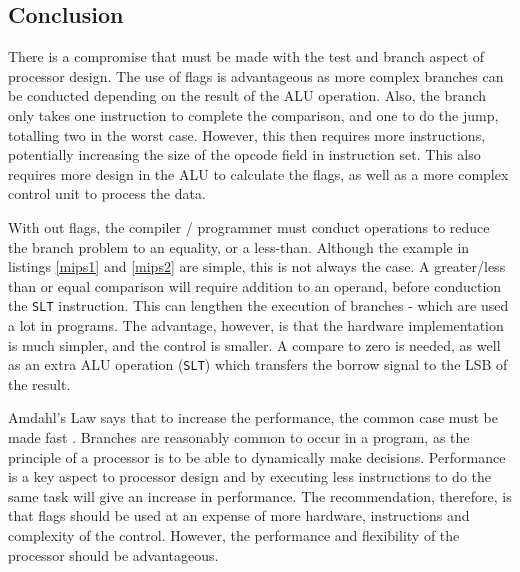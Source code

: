 \documentclass[12pt,a4paper]{article}
\begin{document}
\begin{bibunit}[is-unsrt]
\section{Conclusion}

There is a compromise that must be made with the test and branch aspect of processor design.
The use of flags is advantageous as more complex branches can be conducted depending on the result of the ALU operation.
Also, the branch only takes one instruction to complete the comparison, and one to do the jump, totalling two in the worst case.
However, this then requires more instructions, potentially increasing the size of the opcode field in instruction set.
This also requires more design in the ALU to calculate the flags, as well as a more complex control unit to process the data.

With out flags, the compiler / programmer must conduct operations to reduce the branch problem to an equality, or a less-than. 
Although the example in listings \ref{mips1} and \ref{mips2} are simple, this is not always the case. 
A greater/less than or equal comparison will require addition to an operand, before conduction the \texttt{SLT} instruction.
This can lengthen the execution of branches - which are used a lot in programs.
The advantage, however, is that the hardware implementation is much simpler, and the control is smaller.
A compare to zero is needed, as well as an extra ALU operation (\texttt{SLT}) which transfers the borrow signal to the LSB of the result. 

Amdahl's Law says that to increase the performance, the common case must be made fast \cite{amdahl}.
Branches are reasonably common to occur in a program, as the principle of a processor is to be able to dynamically make decisions. 
Performance is a key aspect to processor design and by executing less instructions to do the same task will give an increase in performance.
The recommendation, therefore, is that flags should be used at an expense of more hardware, instructions and complexity of the control.
However, the performance and flexibility of the processor should be advantageous.

\putbib[references]
\end{bibunit}

\begin{bibunit}[is-unsrt]
\makeatletter
        \renewcommand\@biblabel[1]{\textbullet}
\makeatother

\renewcommand{\refname}{Bibliography}
\nocite{*}
\putbib[bibliography]
\end{bibunit}
%
%
%
%
\end{document}
